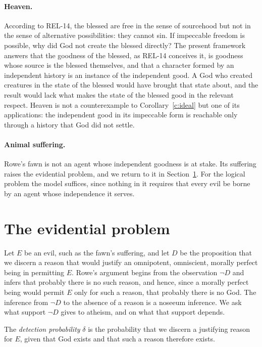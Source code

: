 \documentclass{situationist-preprint}
\begin{document}
\paragraph{Heaven.} According to REL-14, the blessed are free in the sense of sourcehood but not in the sense of alternative possibilities: they cannot sin. If impeccable freedom is possible, why did God not create the blessed directly? The present framework answers that the goodness of the blessed, as REL-14 conceives it, is goodness whose source is the blessed themselves, and that a character formed by an independent history is an instance of the independent good. A God who created creatures in the state of the blessed would have brought that state about, and the result would lack what makes the state of the blessed good in the relevant respect. Heaven is not a counterexample to Corollary~\ref{c:ideal} but one of its applications: the independent good in its impeccable form is reachable only through a history that God did not settle.

\paragraph{Animal suffering.} Rowe's fawn is not an agent whose independent goodness is at stake. Its suffering raises the evidential problem, and we return to it in Section~\ref{s:evidential}. For the logical problem the model suffices, since nothing in it requires that every evil be borne by an agent whose independence it serves.

\section{The evidential problem}\label{s:evidential}

Let $E$ be an evil, such as the fawn's suffering, and let $D$ be the proposition that we discern a reason that would justify an omnipotent, omniscient, morally perfect being in permitting $E$. Rowe's argument begins from the observation $\neg D$ and infers that probably there is no such reason, and hence, since a morally perfect being would permit $E$ only for such a reason, that probably there is no God. The inference from $\neg D$ to the absence of a reason is a noseeum inference. We ask what support $\neg D$ gives to atheism, and on what that support depends.

\begin{definition}[Detection]\label{d:detect}
The \emph{detection probability} $\delta$ is the probability that we discern a justifying reason for $E$, given that God exists and that such a reason therefore exists.
\end{definition}
\end{document}
